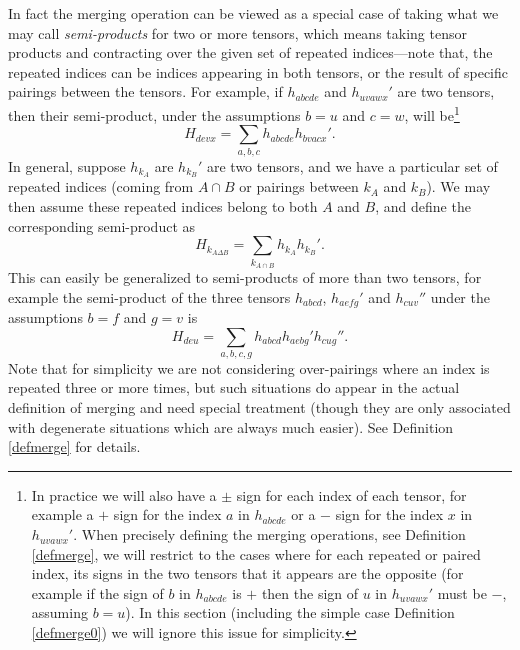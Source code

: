 \documentclass[11 pt,reqno]{amsart}
\theoremstyle{definition}
\theoremstyle{remark}
\numberwithin{equation}{section}
\begin{document}
 In fact the merging operation can be viewed as a special case of taking what we may call \emph{semi-products} for two or more tensors, which means taking tensor products and contracting over the given set of repeated indices---note that, the repeated indices can be indices appearing in both tensors, or the result of specific pairings between the tensors. For example, if $h_{abcde}$ and $h_{uvawx}'$ are two tensors, then their semi-product, under the assumptions $b=u$ and $c=w$, will be\footnote{In practice we will also have a $\pm$ sign for each index of each tensor, for example a $+$ sign for the index $a$ in $h_{abcde}$ or a $-$ sign for the index $x$ in $h_{uvawx}'$. When precisely defining the merging operations, see Definition \ref{defmerge}, we will restrict to the cases where for each repeated or paired index, its signs in the two tensors that it appears are the opposite (for example if the sign of $b$ in $h_{abcde}$ is $+$ then the sign of $u$ in $h_{uvawx}'$ must be $-$, assuming $b=u$). In this section (including the simple case Definition \ref{defmerge0}) we will ignore this issue for simplicity.}
 \[H_{devx}=\sum_{a,b,c}h_{abcde}h_{bvacx}'.\] In general, suppose $h_{k_A}$ are $h_{k_B}'$ are two tensors, and we have a particular set of repeated indices (coming from $A\cap B$ or pairings between $k_A$ and $k_B$). We may then assume these repeated indices belong to both $A$ and $B$, and define the corresponding semi-product as
 \[H_{k_{A\Delta B}}=\sum_{k_{A\cap B}}h_{k_A}h_{k_B}'.\] This can easily be generalized to semi-products of more than two tensors, for example the semi-product of the three tensors $h_{abcd}$, $h_{aefg}'$ and $h_{cuv}''$ under the assumptions $b=f$ and $g=v$ is
 \[H_{deu}=\sum_{a,b,c,g}h_{abcd}h_{aebg}'h_{cug}''.\] Note that for simplicity we are not considering over-pairings where an index is repeated three or more times, but such situations do appear in the actual definition of merging and need special treatment (though they are only associated with degenerate situations which are always much easier). See Definition \ref{defmerge} for details.
 
\end{document}
